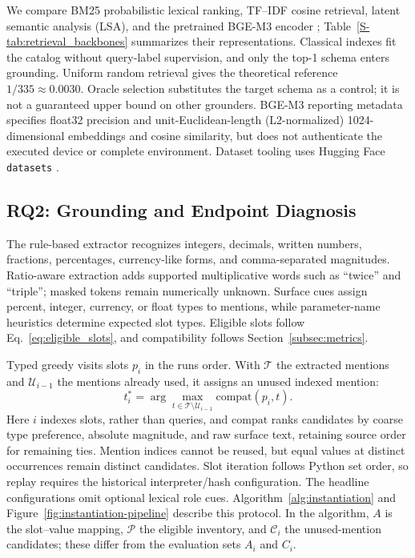 \documentclass[pdflatex,iicol,sn-basic,Numbered]{sn-jnl}
\begin{document}
We compare BM25 probabilistic lexical ranking, TF--IDF cosine retrieval, latent semantic analysis (LSA), and the pretrained BGE-M3 encoder \cite{robertson2009bm25,pedregosa2011sklearn,deerwester1990lsa,chen2024m3embedding}; Table~\ref{S-tab:retrieval_backbones} summarizes their representations. Classical indexes fit the catalog without query-label supervision, and only the top-1 schema enters grounding. Uniform random retrieval gives the theoretical reference $1/335\approx0.0030$. Oracle selection substitutes the target schema as a control; it is not a guaranteed upper bound on other grounders. BGE-M3 reporting metadata specifies float32 precision and unit-Euclidean-length (L2-normalized) 1024-dimensional embeddings and cosine similarity, but does not authenticate the executed device or complete environment. Dataset tooling uses Hugging Face \texttt{datasets} \cite{lhoest2021datasets}.

\subsection{RQ2: Grounding and Endpoint Diagnosis}
\label{subsec:method_instantiation}\label{subsec:method_design}
The rule-based extractor recognizes integers, decimals, written numbers, fractions, percentages, currency-like forms, and comma-separated magnitudes. Ratio-aware extraction adds supported multiplicative words such as ``twice'' and ``triple''; masked tokens remain numerically unknown. Surface cues assign percent, integer, currency, or float types to mentions, while parameter-name heuristics determine expected slot types. Eligible slots follow Eq.~\eqref{eq:eligible_slots}, and compatibility follows Section~\ref{subsec:metrics}.

Typed greedy visits slots $p_i$ in the run\textquotesingle s order. With $\mathcal T$ the extracted mentions and $\mathcal U_{i-1}$ the mentions already used, it assigns an unused indexed mention:
\begin{equation}
t_i^*=\arg\max_{t\in\mathcal T\setminus\mathcal U_{i-1}}\mathrm{compat}(p_i,t).
\label{eq:typed_assignment}
\end{equation}
Here $i$ indexes slots, rather than queries, and $\mathrm{compat}$ ranks candidates by coarse type preference, absolute magnitude, and raw surface text, retaining source order for remaining ties. Mention indices cannot be reused, but equal values at distinct occurrences remain distinct candidates. Slot iteration follows Python set order, so replay requires the historical interpreter/hash configuration. The headline configurations omit optional lexical role cues. Algorithm~\ref{alg:instantiation} and Figure~\ref{fig:instantiation-pipeline} describe this protocol. In the algorithm, $A$ is the slot--value mapping, $\mathcal P$ the eligible inventory, and $\mathcal C_i$ the unused-mention candidates; these differ from the evaluation sets $A_i$ and $C_i$.
\end{document}
